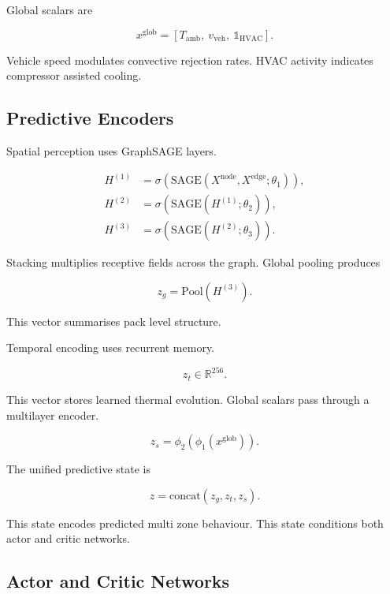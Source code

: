 \documentclass{article}
\begin{document}
Global scalars are

\begin{equation}
x^{\mathrm{glob}} =
[T_{\mathrm{amb}},\ v_{\mathrm{veh}},\ \mathbb{1}_{\mathrm{HVAC}}].
\end{equation}

Vehicle speed modulates convective rejection rates.
HVAC activity indicates compressor assisted cooling.

\subsection{Predictive Encoders}

Spatial perception uses GraphSAGE layers.

\begin{align}
H^{(1)} &= \sigma(\mathrm{SAGE}(X^{\mathrm{node}}, X^{\mathrm{edge}}; \theta_1)),\\
H^{(2)} &= \sigma(\mathrm{SAGE}(H^{(1)}; \theta_2)),\\
H^{(3)} &= \sigma(\mathrm{SAGE}(H^{(2)}; \theta_3)).
\end{align}

Stacking multiplies receptive fields across the graph.
Global pooling produces

\begin{equation}
z_g = \mathrm{Pool}(H^{(3)}).
\end{equation}

This vector summarises pack level structure.

Temporal encoding uses recurrent memory.

\begin{equation}
z_t \in \mathbb{R}^{256}.
\end{equation}

This vector stores learned thermal evolution.
Global scalars pass through a multilayer encoder.

\begin{equation}
z_s = \phi_2(\phi_1(x^{\mathrm{glob}})).
\end{equation}

The unified predictive state is

\begin{equation}
z = \mathrm{concat}(z_g, z_t, z_s).
\end{equation}

This state encodes predicted multi zone behaviour.
This state conditions both actor and critic networks.

\subsection{Actor and Critic Networks}
\end{document}
